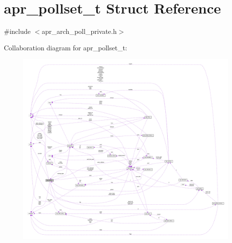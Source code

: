 \hypertarget{structapr__pollset__t}{}\section{apr\+\_\+pollset\+\_\+t Struct Reference}
\label{structapr__pollset__t}


{\ttfamily \#include $<$apr\+\_\+arch\+\_\+poll\+\_\+private.\+h$>$}



Collaboration diagram for apr\+\_\+pollset\+\_\+t\+:
\nopagebreak
\begin{figure}[H]
\begin{center}
\leavevmode
\includegraphics[width=350pt]{structapr__pollset__t__coll__graph}
\end{center}
\end{figure}
